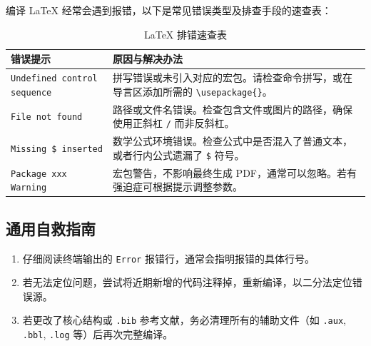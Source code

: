 编译 LaTeX 经常会遇到报错，以下是常见错误类型及排查手段的速查表：

\begin{table}[htbp]
\centering
\caption{LaTeX 排错速查表}
\begin{tabular}{lp{10cm}}
\hline
\textbf{错误提示} & \textbf{原因与解决办法} \\
\hline
\texttt{Undefined control sequence} & 拼写错误或未引入对应的宏包。请检查命令拼写，或在导言区添加所需的 \texttt{\textbackslash usepackage\{\}}。 \\
\texttt{File not found} & 路径或文件名错误。检查包含文件或图片的路径，确保使用正斜杠 \texttt{/} 而非反斜杠。 \\
\texttt{Missing \$ inserted} & 数学公式环境错误。检查公式中是否混入了普通文本，或者行内公式遗漏了 \texttt{\$} 符号。 \\
\texttt{Package xxx Warning} & 宏包警告，不影响最终生成 PDF，通常可以忽略。若有强迫症可根据提示调整参数。 \\
\hline
\end{tabular}
\end{table}

\subsection{通用自救指南}
\begin{enumerate}
    \item 仔细阅读终端输出的 \texttt{Error} 报错行，通常会指明报错的具体行号。
    \item 若无法定位问题，尝试将近期新增的代码注释掉，重新编译，以二分法定位错误源。
    \item 若更改了核心结构或 \texttt{.bib} 参考文献，务必清理所有的辅助文件（如 \texttt{.aux}, \texttt{.bbl}, \texttt{.log} 等）后再次完整编译。
\end{enumerate}
